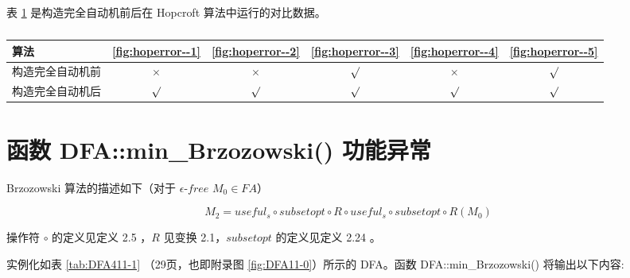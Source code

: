 \newpage
表 \ref{tab:KeepMinResultofAll} 是构造完全自动机前后在 Hopcroft 算法中运行的对比数据。

\begin{table}[!htbp]
    \caption{  }
    \label{tab:KeepMinResultofAll}
    \centering
    \small%
    \setlength{\tabcolsep}{6pt}%
    \renewcommand{\arraystretch}{1.2}%
    \begin{tabular}{l| ccccc} %
        \toprule %
        算法 & \ref{fig:hoperror--1} & \ref{fig:hoperror--2} & \ref{fig:hoperror--3} & \ref{fig:hoperror--4} &  \ref{fig:hoperror--5}  \\
        \midrule
        构造完全自动机前 & $\times$& $\times$& $\surd$ & $\times$    & $\surd$       \\
        构造完全自动机后 & $\surd$ &  $\surd$& $\surd$ & $\surd$     & $\surd$       \\
        \bottomrule%
    \end{tabular}
\end{table}









\section{函数 DFA::min\_Brzozowski() 功能异常}\label{cha:brzozowski}

Brzozowski 算法的描述如下\cite{watson1993taxonomyb}（对于 $\epsilon$-$free$ $M_0 \in FA$）

\[ M_2 = useful_s \circ subsetopt \circ R \circ useful_s \circ subsetopt \circ R(M_0) \] 

操作符 $\circ$ 的定义见定义 2.5 ，$R$ 见变换 2.1，$subsetopt$ 的定义见定义 2.24 。

实例化如表 \ref{tab:DFA411-1} （29页，也即附录图 \ref{fig:DFA11-0}）所示的 DFA。函数 DFA::min\_Brzozowski() 将输出以下内容:

